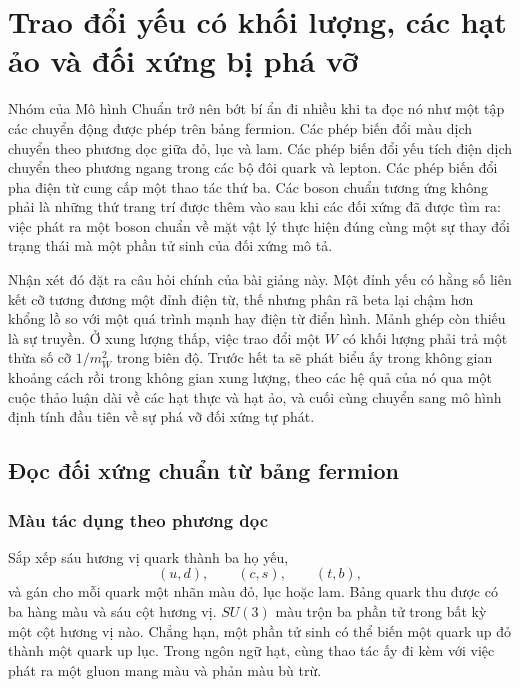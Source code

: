\chapter{Trao đổi yếu có khối lượng, các hạt ảo và đối xứng bị phá vỡ}

Nhóm của Mô hình Chuẩn trở nên bớt bí ẩn đi nhiều khi ta đọc nó như một tập các chuyển động được phép trên bảng fermion. Các phép biến đổi màu dịch chuyển theo phương dọc giữa đỏ, lục và lam. Các phép biến đổi yếu tích điện dịch chuyển theo phương ngang trong các bộ đôi quark và lepton. Các phép biến đổi pha điện từ cung cấp một thao tác thứ ba. Các boson chuẩn tương ứng không phải là những thứ trang trí được thêm vào sau khi các đối xứng đã được tìm ra: việc phát ra một boson chuẩn về mặt vật lý thực hiện đúng cùng một sự thay đổi trạng thái mà một phần tử sinh của đối xứng mô tả.

Nhận xét đó đặt ra câu hỏi chính của bài giảng này. Một đỉnh yếu có hằng số liên kết cỡ tương đương một đỉnh điện từ, thế nhưng phân rã beta lại chậm hơn khổng lồ so với một quá trình mạnh hay điện từ điển hình. Mảnh ghép còn thiếu là sự truyền. Ở xung lượng thấp, việc trao đổi một \(W\) có khối lượng phải trả một thừa số cỡ \(1/m_W^2\) trong biên độ. Trước hết ta sẽ phát biểu ấy trong không gian khoảng cách rồi trong không gian xung lượng, theo các hệ quả của nó qua một cuộc thảo luận dài về các hạt thực và hạt ảo, và cuối cùng chuyển sang mô hình định tính đầu tiên về sự phá vỡ đối xứng tự phát.

\section{Đọc đối xứng chuẩn từ bảng fermion}

\subsection{Màu tác dụng theo phương dọc}

Sắp xếp sáu hương vị quark thành ba họ yếu,
\begin{equation}
  (u,d),\qquad(c,s),\qquad(t,b),
\end{equation}
và gán cho mỗi quark một nhãn màu đỏ, lục hoặc lam. Bảng quark thu được có ba hàng màu và sáu cột hương vị. \(SU(3)\) màu trộn ba phần tử trong bất kỳ một cột hương vị nào. Chẳng hạn, một phần tử sinh có thể biến một quark up đỏ thành một quark up lục. Trong ngôn ngữ hạt, cùng thao tác ấy đi kèm với việc phát ra một gluon mang màu và phản màu bù trừ.

